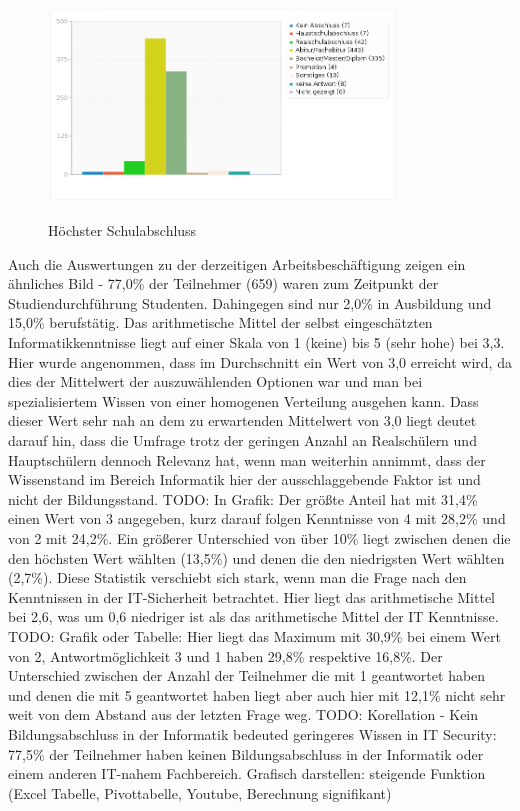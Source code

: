 \begin{figure}[H]
\centering
\includegraphics[scale=0.55]{images/schulabschluss}\\
\caption{Höchster Schulabschluss}\label{schulabschluss}
\end{figure}
Auch die Auswertungen zu der derzeitigen Arbeitsbeschäftigung zeigen ein ähnliches Bild - 77,0\% der Teilnehmer (659) waren zum Zeitpunkt der Studiendurchführung Studenten. Dahingegen sind nur 2,0\% in Ausbildung und 15,0\% berufstätig.
Das arithmetische Mittel der selbst eingeschätzten Informatikkenntnisse liegt auf einer Skala von 1 (keine) bis 5 (sehr hohe) bei 3,3. Hier wurde angenommen, dass im Durchschnitt ein Wert von 3,0 erreicht wird, da dies der Mittelwert der auszuwählenden Optionen war und man bei spezialisiertem Wissen von einer homogenen Verteilung ausgehen kann. Dass dieser Wert sehr nah an dem zu erwartenden Mittelwert von 3,0 liegt deutet darauf hin, dass die Umfrage trotz der geringen Anzahl an Realschülern und Hauptschülern dennoch Relevanz hat, wenn man weiterhin annimmt, dass der Wissenstand im Bereich Informatik hier der ausschlaggebende Faktor ist und nicht der Bildungsstand. TODO: In Grafik: Der größte Anteil hat mit 31,4\% einen Wert von 3 angegeben, kurz darauf folgen Kenntnisse von 4 mit 28,2\% und von 2 mit 24,2\%. Ein größerer Unterschied von über 10\% liegt zwischen denen die den höchsten Wert wählten (13,5\%) und denen die den niedrigsten Wert wählten (2,7\%).
Diese Statistik verschiebt sich stark, wenn man die Frage nach den Kenntnissen in der IT-Sicherheit betrachtet. Hier liegt das arithmetische Mittel bei 2,6, was um 0,6 niedriger ist als das arithmetische Mittel der IT Kenntnisse. TODO: Grafik oder Tabelle: Hier liegt das Maximum mit 30,9\% bei einem Wert von 2, Antwortmöglichkeit 3 und 1 haben 29,8\% respektive 16,8\%. Der Unterschied zwischen der Anzahl der Teilnehmer die mit 1 geantwortet haben und denen die mit 5 geantwortet haben liegt aber auch hier mit 12,1\% nicht sehr weit von dem Abstand aus der letzten Frage weg.
TODO: Korellation - Kein Bildungsabschluss in der Informatik bedeuted geringeres Wissen in IT Security: 77,5\% der Teilnehmer haben keinen Bildungsabschluss in der Informatik oder einem anderen IT-nahem Fachbereich.
Grafisch darstellen: steigende Funktion (Excel Tabelle, Pivottabelle, Youtube, Berechnung signifikant)

